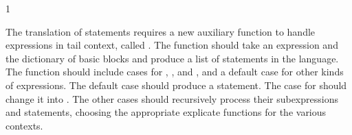 \documentclass[7x10]{TimesAPriori_MIT}%
\def\pythonEd{1}
\def\edition{1}
\newcommand{\pythonColor}[0]{}
\numberwithin{theorem}{chapter}
\numberwithin{definition}{chapter}
\numberwithin{equation}{chapter}
\begin{document}
{\if\edition\pythonEd\pythonColor

The translation of  statements requires a new auxiliary
function to handle expressions in tail context, called
. The function should take an expression and the
dictionary of basic blocks and produce a list of statements in the
\LangCFun{} language.  The  function should
include cases for , , and ,
and a default case for other kinds of expressions. The default case
should produce a  statement. The case for 
should change it into .  The other cases should
recursively process their subexpressions and statements, choosing the
appropriate explicate functions for the various contexts.
  
\fi}

\newcommand{\CfunASTRacket}{
\begin{array}{lcl}
\Exp &::= & \FUNREF{\itm{label}}{\Int} \MID \CALL{\Atm}{\LP\Atm\ldots\RP} \\
\Tail &::= & \TAILCALL{\Atm}{\Atm\ldots} \\
\Def &::=& \DEF{\itm{label}}{\LP[\Var\key{:}\Type]\ldots\RP}{\Type}{\itm{info}}{\LP\LP\itm{label}\,\key{.}\,\Tail\RP\ldots\RP}
\end{array}
}

\newcommand{\CfunASTPython}{
\begin{array}{lcl}
\Exp &::= & \FUNREF{\itm{label}}{\Int} \MID \CALL{\Atm}{\Atm^{*}} \\
\Tail &::= & \TAILCALL{\Atm}{\Atm^{*}} \\
\Params &::=& \LS\LP\Var\key{,}\Type\RP\code{,}\ldots\RS \\
\Block &::=& \itm{label}\key{:} \Stmt^{*}\;\Tail \\
\Def &::=& \DEF{\itm{label}}{\Params}{\LC\Block\code{,}\ldots\RC}{\key{None}}{\Type}{\key{None}} 
\end{array}
}
\end{document}
